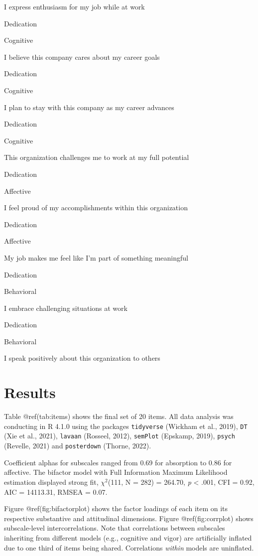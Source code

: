 \documentclass[
]{article}
\begin{document}
I express enthusiasm for my job while at work

Dedication

Cognitive

I believe this company cares about my career goals

Dedication

Cognitive

I plan to stay with this company as my career advances

Dedication

Cognitive

This organization challenges me to work at my full potential

Dedication

Affective

I feel proud of my accomplishments within this organization

Dedication

Affective

My job makes me feel like I'm part of something meaningful

Dedication

Behavioral

I embrace challenging situations at work

Dedication

Behavioral

I speak positively about this organization to others

\hypertarget{results}{%
\section{Results}\label{results}}

Table @ref(tab:items) shows the final set of 20 items. All data analysis
was conducting in R 4.1.0 using the packages \texttt{tidyverse} (Wickham
et al., 2019), \texttt{DT} (Xie et al., 2021), \texttt{lavaan} (Rosseel,
2012), \texttt{semPlot} (Epskamp, 2019), \texttt{psych} (Revelle, 2021)
and \texttt{posterdown} (Thorne, 2022).

Coefficient alphas for subscales ranged from 0.69 for absorption to 0.86
for affective. The bifactor model with Full Information Maximum
Likelihood estimation displayed strong fit, \(\chi^2\)(111, N = 282) =
264.70, \emph{p} \textless{} .001, CFI = 0.92, AIC = 14113.31, RMSEA =
0.07.

Figure @ref(fig:bifactorplot) shows the factor loadings of each item on
its respective substantive and attitudinal dimensions. Figure
@ref(fig:corrplot) shows subscale-level intercorrelations. Note that
correlations between subscales inheriting from different models (e.g.,
cognitive and vigor) are artificially inflated due to one third of items
being shared. Correlations \emph{within} models are uninflated.
\end{document}
